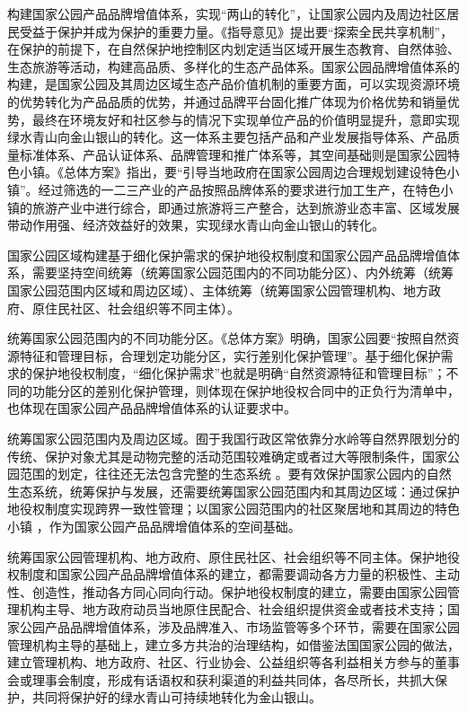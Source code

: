 \documentclass[
]{book}
\begin{document}
构建国家公园产品品牌增值体系，实现``两山的转化''，让国家公园内及周边社区居民受益于保护并成为保护的重要力量。《指导意见》提出要``探索全民共享机制''，在保护的前提下，在自然保护地控制区内划定适当区域开展生态教育、自然体验、生态旅游等活动，构建高品质、多样化的生态产品体系。国家公园品牌增值体系的构建，是国家公园及其周边区域生态产品价值机制的重要方面，可以实现资源环境的优势转化为产品品质的优势，并通过品牌平台固化推广体现为价格优势和销量优势，最终在环境友好和社区参与的情况下实现单位产品的价值明显提升，意即实现绿水青山向金山银山的转化。这一体系主要包括产品和产业发展指导体系、产品质量标准体系、产品认证体系、品牌管理和推广体系等，其空间基础则是国家公园特色小镇。《总体方案》指出，要``引导当地政府在国家公园周边合理规划建设特色小镇''。经过筛选的一二三产业的产品按照品牌体系的要求进行加工生产，在特色小镇的旅游产业中进行综合，即通过旅游将三产整合，达到旅游业态丰富、区域发展带动作用强、经济效益好的效果，实现绿水青山向金山银山的转化。

国家公园区域构建基于细化保护需求的保护地役权制度和国家公园产品品牌增值体系，需要坚持空间统筹（统筹国家公园范围内的不同功能分区）、内外统筹（统筹国家公园范围内区域和周边区域）、主体统筹（统筹国家公园管理机构、地方政府、原住民社区、社会组织等不同主体）。

统筹国家公园范围内的不同功能分区。《总体方案》明确，国家公园要``按照自然资源特征和管理目标，合理划定功能分区，实行差别化保护管理''。基于细化保护需求的保护地役权制度，``细化保护需求''也就是明确``自然资源特征和管理目标''；不同的功能分区的差别化保护管理，则体现在保护地役权合同中的正负行为清单中，也体现在国家公园产品品牌增值体系的认证要求中。

统筹国家公园范围内及周边区域。囿于我国行政区常依靠分水岭等自然界限划分的传统、保护对象尤其是动物完整的活动范围较难确定或者过大等限制条件，国家公园范围的划定，往往还无法包含完整的生态系统 。要有效保护国家公园内的自然生态系统，统筹保护与发展，还需要统筹国家公园范围内和其周边区域：通过保护地役权制度实现跨界一致性管理；以国家公园范围内的社区聚居地和其周边的特色小镇 ，作为国家公园产品品牌增值体系的空间基础。

统筹国家公园管理机构、地方政府、原住民社区、社会组织等不同主体。保护地役权制度和国家公园产品品牌增值体系的建立，都需要调动各方力量的积极性、主动性、创造性，推动各方同心同向行动。保护地役权制度的建立，需要由国家公园管理机构主导、地方政府动员当地原住民配合、社会组织提供资金或者技术支持；国家公园产品品牌增值体系，涉及品牌准入、市场监管等多个环节，需要在国家公园管理机构主导的基础上，建立多方共治的治理结构，如借鉴法国国家公园的做法，建立管理机构、地方政府、社区、行业协会、公益组织等各利益相关方参与的董事会或理事会制度，形成有话语权和获利渠道的利益共同体，各尽所长，共抓大保护，共同将保护好的绿水青山可持续地转化为金山银山。
\end{document}
